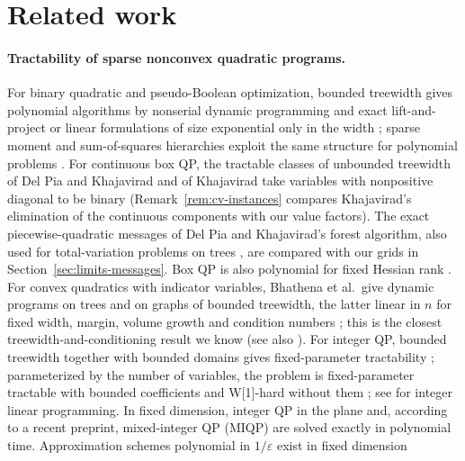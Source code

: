 \section{Related work}\label{sec:related}

\paragraph{Tractability of sparse nonconvex quadratic programs.}
For binary quadratic and pseudo-Boolean optimization, bounded treewidth gives
polynomial algorithms by nonserial dynamic programming
\cite{BerteleBrioschi1972,CramaHansenJaumard1990,Dechter1999} and exact
lift-and-project or linear formulations of size exponential only in the width
\cite{BienstockOzbay2004,WainwrightJordan2004,Laurent2009}; sparse moment and
sum-of-squares hierarchies exploit the same structure for polynomial problems
\cite{WakiEtAl2006,Lasserre2006}. For continuous box QP, the tractable
classes of unbounded treewidth of Del Pia and Khajavirad
\cite{DelPiaKhajavirad2026} and of Khajavirad \cite{Khajavirad2026PolyBox}
take variables with nonpositive diagonal to be binary
(Remark~\ref{rem:cv-instances} compares Khajavirad's elimination of the
continuous components with our value factors). The exact
piecewise-quadratic messages of Del Pia and Khajavirad's forest algorithm,
also used for
total-variation problems on trees
\cite{KolmogorovPockRolinek2016,KuricAhmetspahicPock2024}, are compared with
our grids in Section~\ref{sec:limits-messages}. Box QP is also polynomial for
fixed Hessian rank \cite{HladikCernyRada2021}. For convex quadratics with
indicator variables, Bhathena et al.\ give dynamic programs on trees
\cite{BhathenaEtAl2026Trees} and on graphs of bounded treewidth, the latter
linear in $n$ for fixed width, margin, volume growth and condition numbers
\cite{BhathenaEtAl2026Graphs}; this is the closest treewidth-and-conditioning
result we know (see also \cite{BienstockChen2024}). For integer QP,
bounded treewidth together with bounded domains gives fixed-parameter
tractability \cite{EibenEtAl2019}; parameterized by the number of variables,
the problem is fixed-parameter tractable with bounded coefficients
\cite{Lokshtanov2015} and W[1]-hard without them \cite{Herrmann2026}; see \cite{GanianOrdyniak2018} for integer linear
programming. In fixed dimension, integer QP in the plane
\cite{DelPiaWeismantel2014} and, according to a recent preprint,
mixed-integer QP (MIQP)
\cite{AriHildebrand2026} are solved exactly in polynomial time. Approximation
schemes polynomial in $1/\varepsilon$ exist in fixed dimension
